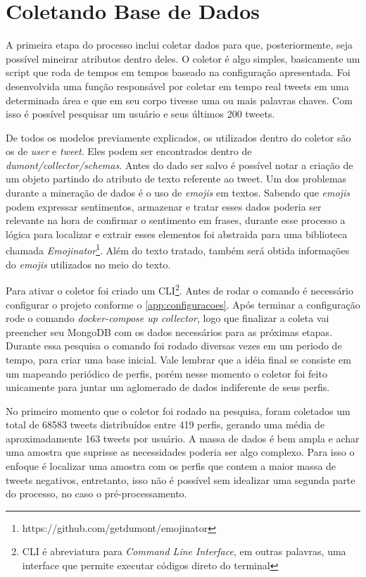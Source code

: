 \section{Coletando Base de Dados}
A primeira etapa do processo inclui coletar dados para que, posteriormente, seja possível mineirar atributos dentro deles. O coletor é algo simples, basicamente um script que roda de tempos em tempos baseado na configuração apresentada. Foi desenvolvida uma função responsável por coletar em tempo real tweets em uma determinada área e que em seu corpo tivesse uma ou mais palavras chaves. Com isso é possível pesquisar um usuário e seus últimos 200 tweets.

De todos os modelos previamente explicados, os utilizados dentro do coletor são os de \textit{user} e \textit{tweet}. Eles podem ser encontrados dentro de \textit{dumont/collector/schemas}. Antes do dado ser salvo é possível notar a criação de um objeto partindo do atributo de texto referente ao tweet. Um dos problemas durante a mineração de dados é o uso de \textit{emojis} em textos. Sabendo que \textit{emojis} podem expressar sentimentos, armazenar e tratar esses dados poderia ser relevante na hora de confirmar o sentimento em frases, durante esse processo a lógica para localizar e extrair esses elementos foi abstraida para uma biblioteca chamada \textit{Emojinator}\footnote{https://github.com/getdumont/emojinator}. Além do texto tratado, também será obtida informações do \textit{emojis} utilizados no meio do texto.

Para ativar o coletor foi criado um CLI\footnote{CLI é abreviatura para \textit{Command Line Interface}, em outras palavras, uma interface que permite executar códigos direto do terminal}. Antes de rodar o comando é necessário configurar o projeto conforme o \autoref{app:configuracoes}. Após terminar a configuração rode o comando \textit{docker-compose up collector}, logo que finalizar a coleta vai preencher seu MongoDB com os dados necessários para as próximas etapas. Durante essa pesquisa o comando foi rodado diversas vezes em um periodo de tempo, para criar uma base inicial. Vale lembrar que a idéia final se consiste em um mapeando periódico de perfis, porém nesse momento o coletor foi feito unicamente para juntar um aglomerado de dados indiferente de seus perfis.

No primeiro momento que o coletor foi rodado na pesquisa, foram coletados um total de 68583 tweets distribuídos entre 419 perfis, gerando uma média de aproximadamente 163 tweets por usuário. A massa de dados é bem ampla e achar uma amostra que suprisse as necessidades poderia ser algo complexo. Para isso o enfoque é localizar uma amostra com os perfis que contem a maior massa de tweets negativos, entretanto, isso não é possível sem idealizar uma segunda parte do processo, no caso o pré-processamento.
